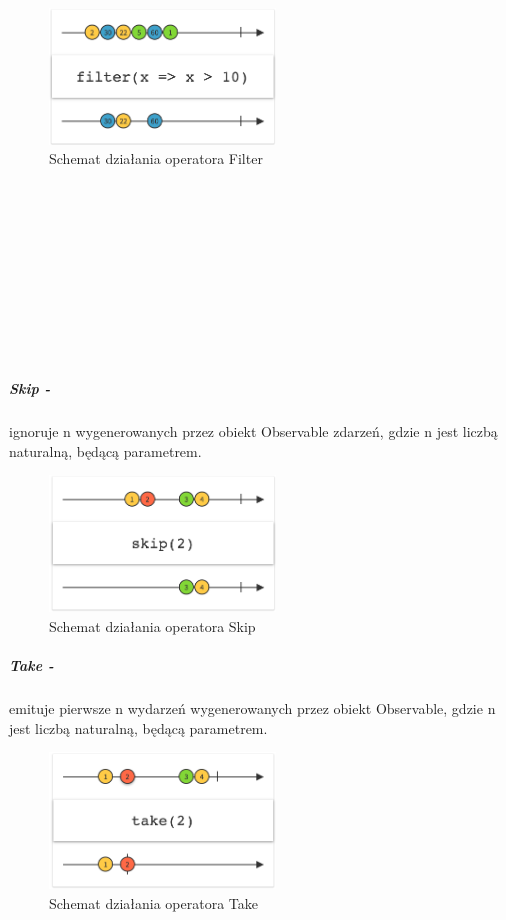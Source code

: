 \documentclass[12pt,oneside,a4paper]{report}
\begin{document}
\begin{figure}[ht!]
	\centering
	\includegraphics[width=6cm]{filter}
	\caption{Schemat działania operatora Filter}
	\label{filter}
\end{figure}
\\\\\\\\\\\\\\\\\\
\subparagraph{Skip -}ignoruje n wygenerowanych przez obiekt Observable zdarzeń, gdzie n jest liczbą naturalną, będącą parametrem.
\begin{figure}[ht!]
	\centering
	\includegraphics[width=6cm]{skip}
	\caption{Schemat działania operatora Skip}
	\label{skip}
\end{figure}
\subparagraph{Take -}emituje pierwsze n wydarzeń wygenerowanych przez obiekt Observable, gdzie n jest liczbą naturalną, będącą parametrem.
\begin{figure}[ht!]
	\centering
	\includegraphics[width=6cm]{take}
	\caption{Schemat działania operatora Take}
	\label{take}
\end{figure}
\pagebreak
\end{document}
